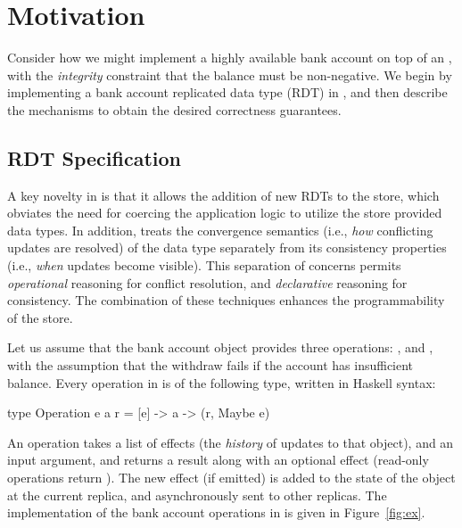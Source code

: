 \section{Motivation}
\label{sec:motivation}

Consider how we might implement a highly available bank account on top of an
\ecds, with the \emph{integrity} constraint that the balance must be
non-negative. We begin by implementing a bank account replicated data type
(RDT) in \name, and then describe the mechanisms to obtain the desired
correctness guarantees.

\subsection{RDT Specification}

A key novelty in \name is that it allows the addition of new RDTs to the store,
which obviates the need for coercing the application logic to utilize the store
provided data types. In addition, \name treats the convergence semantics (i.e.,
\emph{how} conflicting updates are resolved) of the data type separately from
its consistency properties (i.e., \emph{when} updates become visible). This
separation of concerns permits \emph{operational} reasoning for conflict
resolution, and \emph{declarative} reasoning for consistency. The combination
of these techniques enhances the programmability of the store.

Let us assume that the bank account object provides three operations:
,  and , with the assumption that the
withdraw fails if the account has insufficient balance. Every operation in
\name is of the following type, written in Haskell syntax:

\begin{codehaskell}
type Operation e a r = [e] -> a -> (r, Maybe e)
\end{codehaskell}

\noindent An operation takes a list of effects (the \emph{history} of updates to that
object), and an input argument, and returns a result along with an optional
effect (read-only operations return ). The new effect (if emitted)
is added to the state of the object at the current replica, and asynchronously
sent to other replicas. The implementation of the bank account operations in
\name is given in Figure~\ref{fig:ex}.

